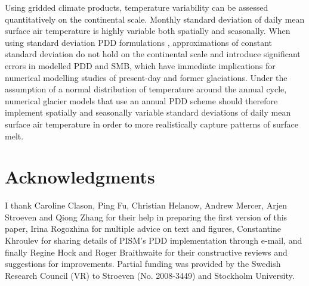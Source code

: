 \documentclass[twocolumn]{igs}
\begin{document}
Using gridded climate products, temperature variability can be assessed quantitatively on the continental scale. Monthly standard deviation of daily mean surface air temperature is highly variable both spatially and seasonally. When using standard deviation PDD formulations \citep{braithwaite-1984,reeh-1991,calov-greve-2005}, approximations of constant standard deviation do not hold on the continental scale and introduce significant errors in modelled PDD and SMB, which have immediate implications for numerical modelling studies of present-day and former glaciations. Under the assumption of a normal distribution of temperature around the annual cycle, numerical glacier models that use an annual PDD scheme should therefore implement spatially and seasonally variable standard deviations of daily mean surface air temperature in order to more realistically capture patterns of surface melt.


\section{Acknowledgments}

I thank Caroline Clason, Ping Fu, Christian Helanow, Andrew Mercer, Arjen Stroeven and Qiong Zhang for their help in preparing the first version of this paper, Irina Rogozhina for multiple advice on text and figures, Constantine Khroulev for sharing details of PISM's PDD implementation through e-mail, and finally Regine Hock and Roger Braithwaite for their constructive reviews and suggestions for improvements. Partial funding was provided by the Swedish Research Council (VR) to Stroeven (No. 2008-3449) and Stockholm University.



\end{document}
